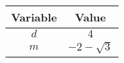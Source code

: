 \begin{tabular}{|c|c|}
\hline
\textbf{Variable} & \textbf{Value} \\
\hline
$d$ & $4$ \\
\hline
$m$ & $-2-\sqrt{3}$ \\
\hline
\end{tabular}
